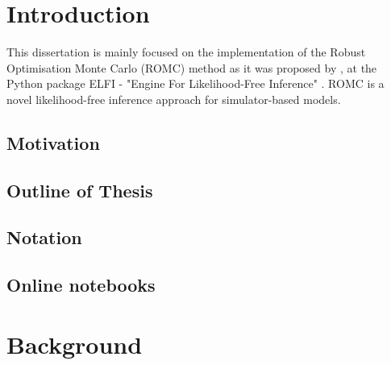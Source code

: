 \documentclass[11pt,twoside]{article}
\numberwithin{Theorem}{section}
\numberwithin{Definition}{section}
\numberwithin{Lemma}{section}
\numberwithin{Algorithm}{section}
\numberwithin{equation}{section}
\begin{document}
\pagestyle{plain}
\setcounter{page}{1}

\tableofcontents
\clearpage
\listoftables
\listoffigures
\cleardoublepage

\setcounter{page}{1}

\nocite{*}
\clearpage


\section{Introduction}
\label{sec:introduction}
 This dissertation is mainly focused on the implementation of the
Robust Optimisation Monte Carlo (ROMC) method as it was proposed by
\autocite{Ikonomov2019}, at the Python package ELFI - "Engine For
Likelihood-Free Inference" \autocite{1708.00707}. ROMC is a novel
likelihood-free inference approach for simulator-based models.

\subsection{Motivation}
\label{subsec:motivation}
% 


\subsection{Outline of Thesis}
\label{subsec:outline-of-thesis}
% 


\subsection{Notation}
\label{subsec:notation}
% 


\subsection{Online notebooks}
\label{subsec:notebooks}
% 

\clearpage


\section{Background}
\label{sec:background}
\end{document}

